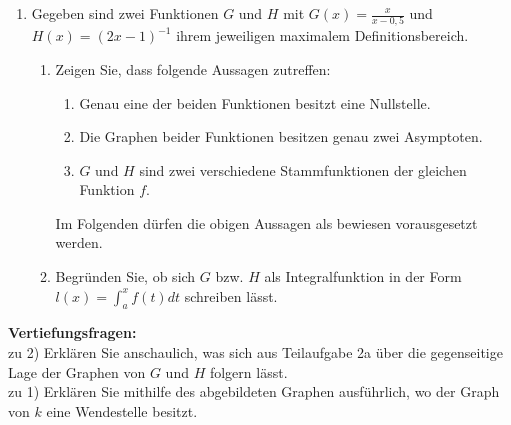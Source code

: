 \documentclass[a4paper,12pt]{article}
\begin{document}
\begin{enumerate}
  \item Gegeben sind zwei Funktionen $G$ und $H$ mit $G(x)=\frac{x}{x-0,5}$ und $H(x) = (2x-1)^{-1}$ ihrem jeweiligen maximalem Definitionsbereich.

      \begin{enumerate}[label={\alph*)}]
        \item Zeigen Sie, dass folgende Aussagen zutreffen:
          \begin{enumerate}[label={(\arabic*)}]
            \item Genau eine der beiden Funktionen besitzt eine Nullstelle. 
            \item Die Graphen beider Funktionen besitzen genau zwei Asymptoten.
            \item $G$ und $H$ sind zwei verschiedene Stammfunktionen der gleichen Funktion $f$.
          \end{enumerate}

          Im Folgenden dürfen die obigen Aussagen als bewiesen vorausgesetzt werden.

        \item Begründen Sie, ob sich $G$ bzw. $H$ als Integralfunktion in der Form $l(x) = \int_{a}^{x} f(t) dt$ schreiben lässt.
      \end{enumerate}
    \end{enumerate}


\textbf{Vertiefungsfragen:}\\
zu 2) Erklären Sie anschaulich, was sich aus Teilaufgabe 2a über die gegenseitige Lage der Graphen von $G$ und $H$ folgern lässt.\\
zu 1) Erklären Sie mithilfe des abgebildeten Graphen ausführlich, wo der Graph von $k$ eine Wendestelle besitzt.


\newpage
\end{document}
